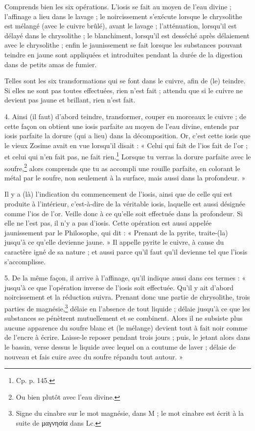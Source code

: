 \documentclass[a4paper, 11pt, oneside, polutonikogreek, french]{article}
\begin{document}
Comprends bien les six opérations. L'iosis se fait au moyen de l'eau divine ; l'affinage a lieu dans le lavage ; le noircissement s'exécute lorsque le chrysolithe est mélangé (avec le cuivre brûlé), avant le lavage ; l'atténuation, lorsqu'il est délayé dans le chrysolithe ; le blanchiment, lorsqu'il est desséché après délaiement avec le chrysolithe ; enfin le jaunissement se fait lorsque les substances pouvant teindre en jaune sont appliquées et introduites pendant la durée de la digestion dans de petits amas de fumier.

Telles sont les six transformations qui se font dans le cuivre, afin de (le) teindre. Si elles ne sont pas toutes effectuées, rien n'est fait ; attendu que si le cuivre ne devient pas jaune et brillant, rien n'est fait.

4. Ainsi (il faut) d'abord teindre, transformer, couper en morceaux le cuivre ; de cette façon on obtient une iosis parfaite au moyen de l'eau divine, entends par iosis parfaite la dorure (qui a lieu) dans la décomposition. Or, c'est cette iosis que le vieux Zosime avait en vue lorsqu'il disait : « Celui qui fait de l'ios fait de l'or ; et celui qui n'en fait pas, ne fait rien.\footnote{Cp. p. 145.} Lorsque tu verras la dorure parfaite avec le soufre,\footnote{Ou bien plutôt avec l'eau divine.} alors comprends que tu as accompli une rouille parfaite, en colorant le métal par le soufre, non seulement à la surface, mais aussi dans la profondeur. »

Il y a (là) l'indication du commencement de l'iosis, ainsi que de celle qui est produite à l'intérieur, c'est-à-dire de la véritable iosis, laquelle est aussi désignée comme l'ios de l'or. Veille donc à ce qu'elle soit effectuée dans la profondeur. Si elle ne l'est pas, il n'y a pas d'iosis. Cette opération est aussi appelée jaunissement par le Philosophe, qui dit : « Prenant de la pyrite, traite-(la) jusqu'à ce qu'elle devienne jaune. » Il appelle pyrite le cuivre, à cause du caractère igné de sa nature ; et aussi parce qu'il faut qu'il devienne tel que l'iosis s'accomplisse.

5. De la même façon, il arrive à l'affinage, qu'il indique aussi dans ces termes : « jusqu'à ce que l'opération inverse de l'iosis soit effectuée. Qu'il y ait d'abord noircissement et la réduction suivra. Prenant donc une partie de chrysolithe, trois parties de magnésie,\footnote{Signe du cinabre sur le mot magnésie, dans M ; le mot cinabre est écrit à la suite de μαγνησία dans Lc.} délaie en l'absence de tout liquide ; délaie jusqu'à ce que les substances se pénètrent mutuellement et se combinent. Alors il ne subsiste plus aucune apparence du soufre blanc et (le mélange) devient tout à fait noir comme de l'encre à écrire. Laisse-le reposer pendant trois jours ; puis, le jetant alors dans le bassin, verse dessus le liquide avec lequel on a coutume de laver ; délaie de nouveau et fais cuire avec du soufre répandu tout autour. »
\end{document}
